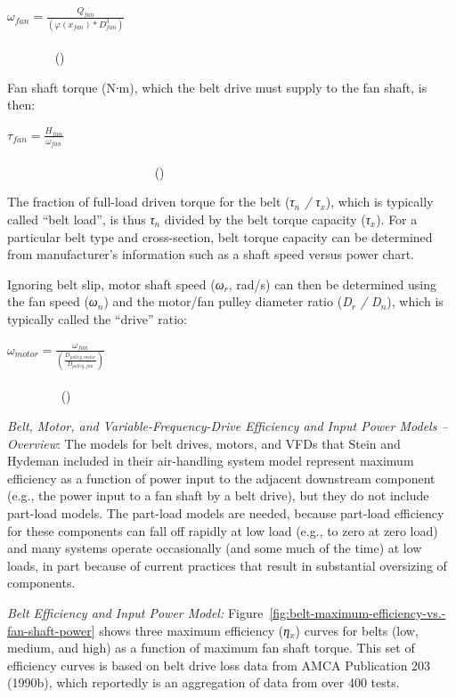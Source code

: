 \({\omega_{fan}} = \frac{{{Q_{fan}}}}{{\left( {\varphi ({x_{fan}}) * D_{fan}^3} \right)}}\) ~~~~~~~~~~~~~~~~~~~~~~~~~~~~~~~~~~~~~~~~~~~~~~~~~~~~~~~~~~~~~~~~~~~~~~~~~~~~~~~ ()

Fan shaft torque (N∙m), which the belt drive must supply to the fan shaft, is then:

\({\tau_{fan}} = \frac{{{H_{fan}}}}{{{\omega_{fan}}}}\) ~~~~~~~~~~~~~~~~~~~~~~~~~~~~~~~~~~~~~~~~~~~~~~~~~~~~~~~~~~~~~~~~~~~~~~~~~~~~~~~~~~~~~~~~~~~~~~~ ()

The fraction of full-load driven torque for the belt (\emph{τ\(_{n}\) / τ\(_{x}\)}), which is typically called ``belt load'', is thus \emph{τ\(_{n}\)} divided by the belt torque capacity (\emph{τ\(_{x}\)}). For a particular belt type and cross-section, belt torque capacity can be determined from manufacturer's information such as a shaft speed versus power chart.

Ignoring belt slip, motor shaft speed (\emph{ω\(_{r}\)}, rad/s) can then be determined using the fan speed (\emph{ω\(_{n}\)}) and the motor/fan pulley diameter ratio (\emph{D\(_{r}\) / D\(_{n}\)}), which is typically called the ``drive'' ratio:

\({\omega_{motor}} = \frac{{{\omega_{fan}}}}{{\left( {\frac{{{D_{pulley,motor}}}}{{{D_{pulley,fan}}}}} \right)}}\) ~~~~~~~~~~~~~~~~~~~~~~~~~~~~~~~~~~~~~~~~~~~~~~~~~~~~~~~~~~~~~~~~~~~~~~~~~~~~~~~~ ()

\emph{Belt, Motor, and Variable-Frequency-Drive Efficiency and Input Power Models -- Overview}: The models for belt drives, motors, and VFDs that Stein and Hydeman included in their air-handling system model represent maximum efficiency as a function of power input to the adjacent downstream component (e.g., the power input to a fan shaft by a belt drive), but they do not include part-load models. The part-load models are needed, because part-load efficiency for these components can fall off rapidly at low load (e.g., to zero at zero load) and many systems operate occasionally (and some much of the time) at low loads, in part because of current practices that result in substantial oversizing of components.

\emph{Belt Efficiency and Input Power Model:} Figure~\ref{fig:belt-maximum-efficiency-vs.-fan-shaft-power} shows three maximum efficiency (\emph{η\(_{x}\)}) curves for belts (low, medium, and high) as a function of maximum fan shaft torque. This set of efficiency curves is based on belt drive loss data from AMCA Publication 203 (1990b), which reportedly is an aggregation of data from over 400 tests.

